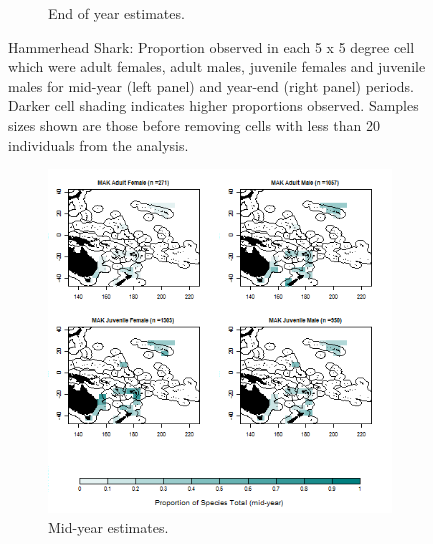 \documentclass[12pt]{SCreport}
\begin{document}
\begin{landscape}
\begin{figure}
\begin{subfigure}[b]{0.6\textwidth}
       \caption{End of year estimates.}
       \label{fig:test2}
   \end{subfigure}
\caption{Hammerhead Shark: Proportion observed in each 5 x 5 degree cell which were adult females, adult males, juvenile females and juvenile males for mid-year (left panel) and year-end (right panel) periods. Darker cell shading indicates higher proportions observed. Samples sizes shown are those before removing cells with less than 20 individuals from the analysis. }
\label{fig:test} 
\end{figure}
\end{landscape}

\begin{landscape}
\begin{figure}
\centering
   \begin{subfigure}[b]{0.6\textwidth}
       \includegraphics[width=\textwidth]{../GRAPHICS/Defined/BI_26_Map_maturity_sex_MAK_MY}
       \caption{Mid-year estimates.}
       \label{fig:test1}
   \end{subfigure}
   \begin{subfigure}[b]{0.6\textwidth}

\end{subfigure}
\end{figure}
\end{landscape}
\end{document}
